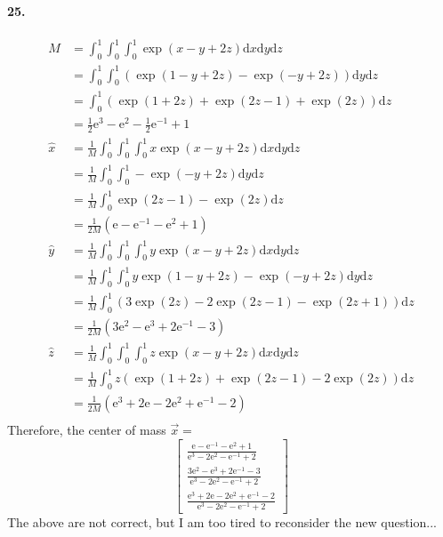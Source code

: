 \documentclass[11pt, a4paper]{article}
\begin{document}
\paragraph{25.}
$$\begin{aligned}
    M &= \int_{0}^{1}\int_{0}^{1}\int_{0}^{1} \exp(x - y + 2z) \mathrm{d}x\mathrm{d}y\mathrm{d}z \\
    &=\int_{0}^{1}\int_{0}^{1}(\exp(1-y+2z) - \exp(-y+2z))\mathrm{d}y\mathrm{d}z \\
    &=\int_{0}^{1}(\exp(1+2z)+\exp(2z-1)+\exp(2z))\mathrm{d}z \\
    &= \frac{1}{2}\mathrm{e}^3 - \mathrm{e}^2 - \frac{1}{2}\mathrm{e}^{-1} + 1 \\
    \hat{x} &= \frac{1}{M} \int_{0}^{1}\int_{0}^{1}\int_{0}^{1} x\exp(x-y+2z)\mathrm{d}x\mathrm{d}y\mathrm{d}z \\
    &= \frac{1}{M} \int_{0}^{1}\int_{0}^{1}-\exp(-y+2z)\mathrm{d}y\mathrm{d}z \\
    &= \frac{1}{M}\int_{0}^{1}\exp(2z-1)-\exp(2z) \mathrm{d}z \\
    &= \frac{1}{2M}(\mathrm{e} - \mathrm{e}^{-1} - \mathrm{e}^2 + 1) \\
    \hat{y} &= \frac{1}{M} \int_{0}^{1}\int_{0}^{1}\int_{0}^{1} y\exp(x-y+2z)\mathrm{d}x\mathrm{d}y\mathrm{d}z \\
    &= \frac{1}{M} \int_{0}^{1}\int_{0}^{1}y\exp(1-y+2z)-\exp(-y+2z)\mathrm{d}y\mathrm{d}z \\
    &= \frac{1}{M} \int_{0}^{1}(3\exp(2z)-2\exp(2z-1)-\exp(2z+1))\mathrm{d}z \\
    &= \frac{1}{2M}(3\mathrm{e}^2-\mathrm{e}^3+2\mathrm{e}^{-1}-3) \\
    \hat{z} &= \frac{1}{M} \int_{0}^{1}\int_{0}^{1}\int_{0}^{1} z\exp(x-y+2z)\mathrm{d}x\mathrm{d}y\mathrm{d}z \\
    &= \frac{1}{M} \int_{0}^{1} z(\exp(1+2z)+\exp(2z-1)-2\exp(2z))\mathrm{d}z \\
    &= \frac{1}{2M}(\mathrm{e}^3 + 2\mathrm{e} - 2\mathrm{e}^2+\mathrm{e}^{-1}-2) \\
\end{aligned}$$
Therefore, the center of mass $\vec{x} = $
$$\begin{bmatrix}
    \frac{\mathrm{e} - \mathrm{e}^{-1} - \mathrm{e}^2 + 1}{\mathrm{e}^3 - 2\mathrm{e}^2 - \mathrm{e}^{-1} + 2} \\
    \frac{3\mathrm{e}^2-\mathrm{e}^3+2\mathrm{e}^{-1}-3}{\mathrm{e}^3 - 2\mathrm{e}^2 - \mathrm{e}^{-1} + 2} \\
    \frac{\mathrm{e}^3 + 2\mathrm{e} - 2\mathrm{e}^2+\mathrm{e}^{-1}-2}{\mathrm{e}^3 - 2\mathrm{e}^2 - \mathrm{e}^{-1} + 2}
\end{bmatrix}$$
The above are not correct, but I am too tired to reconsider the new question...
\end{document}
